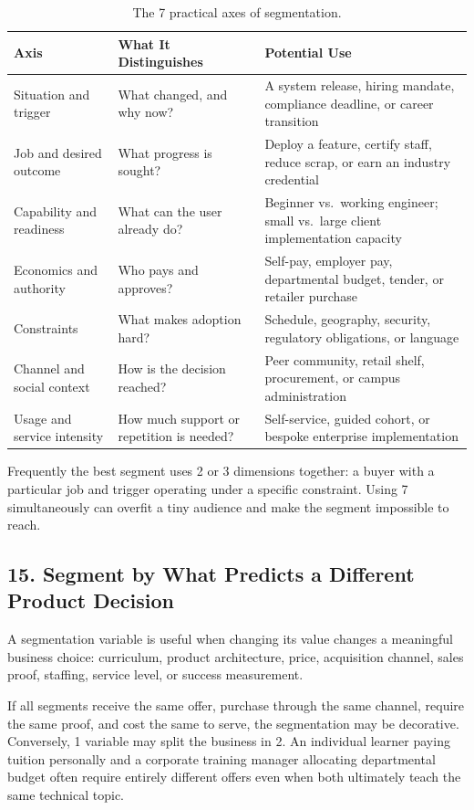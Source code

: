 \begin{table}[t]
\centering
\small
\begin{tabularx}{\textwidth}{l p{5cm} X}
\toprule
\textbf{Axis} & \textbf{What It Distinguishes} & \textbf{Potential Use} \\
\midrule
Situation and trigger & What changed, and why now? & A system release, hiring mandate, compliance deadline, or career transition \\
Job and desired outcome & What progress is sought? & Deploy a feature, certify staff, reduce scrap, or earn an industry credential \\
Capability and readiness & What can the user already do? & Beginner vs.\ working engineer; small vs.\ large client implementation capacity \\
Economics and authority & Who pays and approves? & Self-pay, employer pay, departmental budget, tender, or retailer purchase \\
Constraints & What makes adoption hard? & Schedule, geography, security, regulatory obligations, or language \\
Channel and social context & How is the decision reached? & Peer community, retail shelf, procurement, or campus administration \\
Usage and service intensity & How much support or repetition is needed? & Self-service, guided cohort, or bespoke enterprise implementation \\
\bottomrule
\end{tabularx}
\caption{The 7 practical axes of segmentation.}
\label{tab:ch7-segmentation-axes}
\end{table}

Frequently the best segment uses 2 or 3 dimensions together: a buyer with a particular job and trigger operating under a specific constraint. Using 7 simultaneously can overfit a tiny audience and make the segment impossible to reach.

\subsection*{15. Segment by What Predicts a Different Product Decision}

A segmentation variable is useful when changing its value changes a meaningful business choice: curriculum, product architecture, price, acquisition channel, sales proof, staffing, service level, or success measurement.

If all segments receive the same offer, purchase through the same channel, require the same proof, and cost the same to serve, the segmentation may be decorative. Conversely, 1 variable may split the business in 2. An individual learner paying tuition personally and a corporate training manager allocating departmental budget often require entirely different offers even when both ultimately teach the same technical topic.

